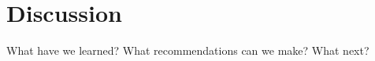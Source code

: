 \section{Discussion}
\label{s:discussion}

What have we learned? What recommendations can we make? What next?
